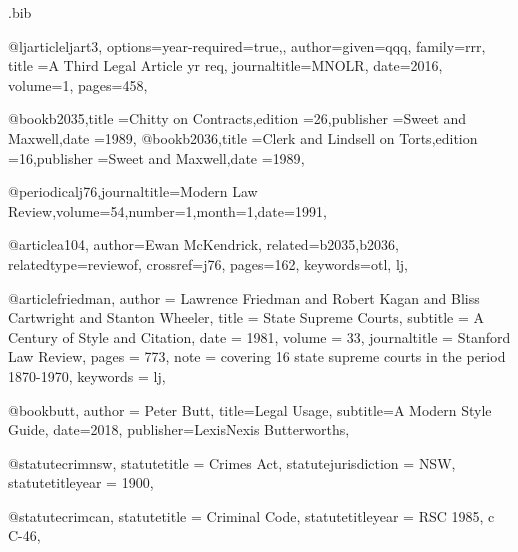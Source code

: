 \begin{filecontents*}{\jobname.bib}


@ljarticle{ljart3,
options={year-required=true,},
author={given=qqq, family=rrr},
title ={A Third Legal Article yr req},
journaltitle={MNOLR},
date={2016},
volume={1},
pages={458},
}

@book{b2035,title ={Chitty on Contracts},edition ={26},publisher ={Sweet and Maxwell},date ={1989},}
@book{b2036,title ={Clerk and Lindsell on Torts},edition ={16},publisher ={Sweet and Maxwell},date ={1989},}

@periodical{j76,journaltitle={Modern Law Review},volume={54},number={1},month={1},date={1991},}

@article{a104,
author={Ewan McKendrick},
related={b2035,b2036},
relatedtype={reviewof},
crossref={j76},
pages={162},
keywords={otl, lj},
}




@article{friedman,
author = {Lawrence Friedman and Robert Kagan and Bliss Cartwright and Stanton Wheeler},
title = {State Supreme Courts},
subtitle = {A Century of Style and Citation},
date = {1981},
volume = {33},
journaltitle = {Stanford Law Review},
pages = {773},
note = {covering 16 state supreme courts in the period 1870-1970},
keywords = {lj},
}



@book{butt,
author = {Peter Butt},
title={Legal Usage},
subtitle={A Modern Style Guide},
date={2018},
publisher={LexisNexis Butterworths},
}


@statute{crimnsw,
statutetitle = {Crimes Act},
statutejurisdiction = {NSW},
statutetitleyear = {1900},%
}


@statute{crimcan,
statutetitle = {Criminal Code},
statutetitleyear = {RSC 1985, c C-46},%
}



\end{filecontents*}
